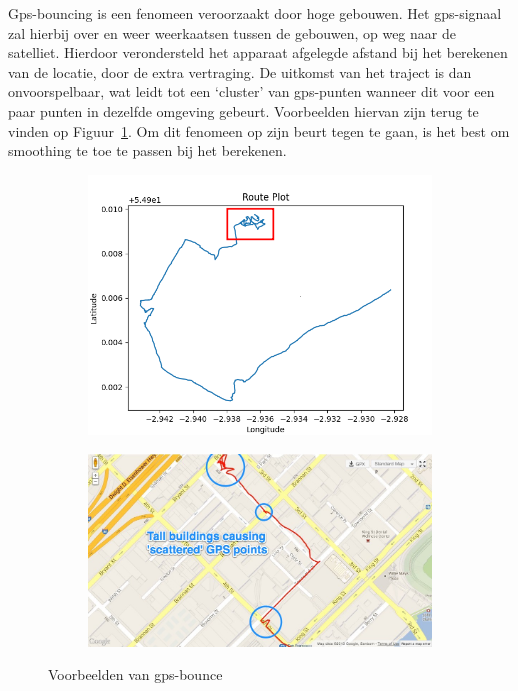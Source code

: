 Gps-bouncing is een fenomeen veroorzaakt door hoge gebouwen. Het
\ac{gps}-signaal zal hierbij over en weer weerkaatsen tussen de gebouwen, op
weg naar de satelliet. Hierdoor verondersteld het apparaat afgelegde afstand
bij het berekenen van de locatie, door de extra vertraging. De uitkomst van het
traject is dan onvoorspelbaar, wat leidt tot een `cluster' van \ac{gps}-punten
wanneer dit voor een paar punten in dezelfde omgeving gebeurt. Voorbeelden
hiervan zijn terug te vinden op Figuur~\ref{fig:gps_bounce}. Om dit fenomeen op
zijn beurt tegen te gaan, is het best om smoothing te toe te passen bij het
berekenen.
\begin{figure}
    \centering
    \begin{subfigure}[b]{0.49\textwidth}
        \centering
        \includegraphics[width=\textwidth]{fig/Afwijkingen&Analyses/Crooked Routes/Crooked GPS Route_Cart.png}
    \end{subfigure}
    \begin{subfigure}[b]{0.49\textwidth}
        \centering
        \includegraphics[width=\textwidth]{fig/Afwijkingen&Analyses/Crooked Routes/GPS_bounce_map.jpg}
    \end{subfigure}
    \caption{Voorbeelden van \ac{gps}-bounce~\cite{BadGPSDa19:online}}\label{fig:gps_bounce}
\end{figure}

